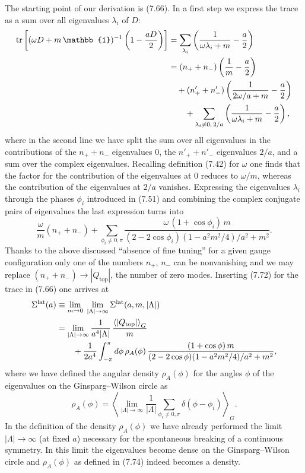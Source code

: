 The starting point of our derivation is (7.66). In a first step we express the
trace as a sum over all eigenvalues $\lambda_i$ of $D$:
\begin{align}
  \tr\left[(\omega D + m\,\mathbb{1})^{-1}\left(1-\frac{aD}{2}\right)\right]
  &= \sum_{\lambda_i}\left(\frac{1}{\omega\lambda_i + m} - \frac{a}{2}\right) \notag\\
  &= (n_+ + n_-)\left(\frac{1}{m} - \frac{a}{2}\right) \notag\\
  &\quad + (n'_+ + n'_-)\left(\frac{1}{2\omega/a + m} - \frac{a}{2}\right) \notag\\
  &\qquad + \sum_{\lambda_i \neq 0,\,2/a}\left(\frac{1}{\omega\lambda_i + m} - \frac{a}{2}\right),
\end{align}
where in the second line we have split the sum over all eigenvalues in the
contributions of the $n_+ + n_-$ eigenvalues $0$, the $n'_+ + n'_-$ eigenvalues
$2/a$, and a sum over the complex eigenvalues. Recalling definition (7.42) for
$\omega$ one finds that the factor for the contribution of the eigenvalues at
$0$ reduces to $\omega/m$, whereas the contribution of the eigenvalues at
$2/a$ vanishes. Expressing the eigenvalues $\lambda_i$ through the phases
$\phi_i$ introduced in (7.51) and combining the complex conjugate pairs of
eigenvalues the last expression turns into
\begin{equation}
  \frac{\omega}{m}(n_+ + n_-) + \sum_{\phi_i \neq 0,\pi}
  \frac{\omega\,(1+\cos\phi_i)\,m}{(2-2\cos\phi_i)(1-a^2m^2/4)/a^2 + m^2} .
\end{equation}
Thanks to the above discussed ``absence of fine tuning'' for a given gauge
configuration only one of the numbers $n_+$, $n_-$ can be nonvanishing and we
may replace $(n_+ + n_-) \to |Q_{\mathrm{top}}|$, the number of zero modes.
Inserting (7.72) for the trace in (7.66) one arrives at
\begin{align}
  \Sigma^{\mathrm{lat}}(a) &\equiv \lim_{m\to 0}\;\lim_{|\Lambda|\to\infty}
  \Sigma^{\mathrm{lat}}(a,m,|\Lambda|) \notag\\
  &= \lim_{|\Lambda|\to\infty}\frac{1}{a^4|\Lambda|}\,\frac{\left\langle |Q_{\mathrm{top}}| \right\rangle_G}{m}
   \notag\\
  &\qquad + \frac{1}{2a^4}\int_{-\pi}^{\pi}d\phi\,\rho_A(\phi)\,
     \frac{(1+\cos\phi)\,m}{(2-2\cos\phi)(1-a^2m^2/4)/a^2 + m^2},
\end{align}
where we have defined the angular density $\rho_A(\phi)$ for the angles
$\phi$ of the eigenvalues on the Ginsparg--Wilson circle as
\begin{equation}
  \rho_A(\phi) = \left\langle \lim_{|\Lambda|\to\infty}\frac{1}{|\Lambda|}
  \sum_{\phi_i \neq 0,\pi}\delta(\phi-\phi_i)\right\rangle_G .
\end{equation}
In the definition of the density $\rho_A(\phi)$ we have already performed the
limit $|\Lambda| \to \infty$ (at fixed $a$) necessary for the spontaneous
breaking of a continuous symmetry. In this limit the eigenvalues become dense
on the Ginsparg--Wilson circle and $\rho_A(\phi)$ as defined in (7.74) indeed
becomes a density.

